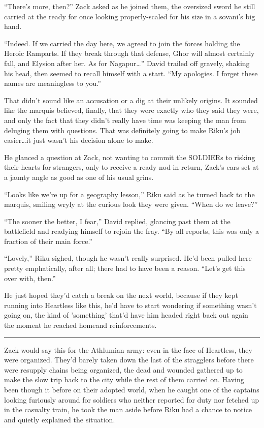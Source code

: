 ``There's more, then?'' Zack asked as he joined them, the oversized sword he still carried at the ready for once looking properly-scaled for his size in a sovani's big hand.

``Indeed. If we carried the day here, we agreed to join the forces holding the Heroic Ramparts. If they break through that defense, Ghor will almost certainly fall, and Elysion after her. As for Nagapur\ldots '' David trailed off gravely, shaking his head, then seemed to recall himself with a start. ``My apologies. I forget these names are meaningless to you.''

That didn't sound like an accusation or a dig at their unlikely origins. It sounded like the marquis believed, finally, that they were exactly who they said they were, and only the fact that they didn't really have time was keeping the man from deluging them with questions. That was definitely going to make Riku's job easier\ldots it just wasn't his decision alone to make.

He glanced a question at Zack, not wanting to commit the SOLDIERs to risking their hearts for strangers, only to receive a ready nod in return, Zack's ears set at a jaunty angle as good as one of his usual grins.

``Looks like we're up for a geography lesson,'' Riku said as he turned back to the marquis, smiling wryly at the curious look they were given. ``When do we leave?''

``The sooner the better, I fear,'' David replied, glancing past them at the battlefield and readying himself to rejoin the fray. ``By all reports, this was only a fraction of their main force.''

``Lovely,'' Riku sighed, though he wasn't really surprised. He'd been pulled here pretty emphatically, after all; there had to have been a reason. ``Let's get this over with, then.''

He just hoped they'd catch a break on the next world, because if they kept running into Heartless like this, he'd have to start wondering if something wasn't going on, the kind of 'something' that'd have him headed right back out again the moment he reached home\textemdash and reinforcements.

\fancybreak{\pfbreakdisplay}


Zack would say this for the Athlumian army: even in the face of Heartless, they were organized. They'd barely taken down the last of the stragglers before there were resupply chains being organized, the dead and wounded gathered up to make the slow trip back to the city while the rest of them carried on. Having been though it before on their adopted world, when he caught one of the captains looking furiously around for soldiers who neither reported for duty nor fetched up in the casualty train, he took the man aside before Riku had a chance to notice and quietly explained the situation.

